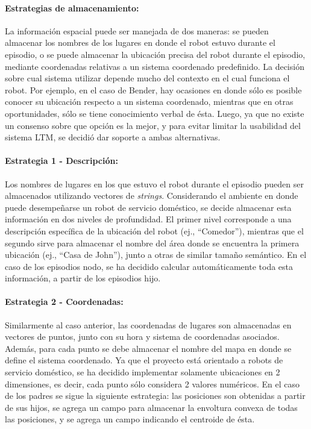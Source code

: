 \paragraph{Estrategias de almacenamiento:}
La información espacial puede ser manejada de dos maneras: se pueden almacenar los nombres de los lugares en donde el robot estuvo durante el episodio, o se puede almacenar la ubicación precisa del robot durante el episodio, mediante coordenadas relativas a un sistema coordenado predefinido. La decisión sobre cual sistema utilizar depende mucho del contexto en el cual funciona el robot. Por ejemplo, en el caso de Bender, hay ocasiones en donde sólo es posible conocer su ubicación respecto a un sistema coordenado, mientras que en otras oportunidades, sólo se tiene conocimiento verbal de ésta. Luego, ya que no existe un consenso sobre que opción es la mejor, y para evitar limitar la usabilidad del sistema LTM, se decidió dar soporte a ambas alternativas.

\paragraph{Estrategia 1 - Descripción:}
Los nombres de lugares en los que estuvo el robot durante el episodio pueden ser almacenados utilizando vectores de \textit{strings}. Considerando el ambiente en donde puede desempeñarse un robot de servicio doméstico, se decide almacenar esta información en dos niveles de profundidad. El primer nivel corresponde a una descripción específica de la ubicación del robot (ej., ``Comedor''), mientras que el segundo sirve para almacenar el nombre del área donde se encuentra la primera ubicación (ej., ``Casa de John''), junto a otras de similar tamaño semántico. En el caso de los episodios nodo, se ha decidido calcular automáticamente toda esta información, a partir de los episodios hijo.

\paragraph{Estrategia 2 - Coordenadas:}
Similarmente al caso anterior, las coordenadas de lugares son almacenadas en vectores de puntos, junto con su hora y sistema de coordenadas asociados. Además, para cada punto se debe almacenar el nombre del mapa en donde se define el sistema coordenado. Ya que el proyecto está orientado a robots de servicio doméstico, se ha decidido implementar solamente ubicaciones en 2 dimensiones, es decir, cada punto sólo considera 2 valores numéricos. En el caso de los padres se sigue la siguiente estrategia: las posiciones son obtenidas a partir de sus hijos, se agrega un campo para almacenar la envoltura convexa de todas las posiciones, y se agrega un campo indicando el centroide de ésta.


